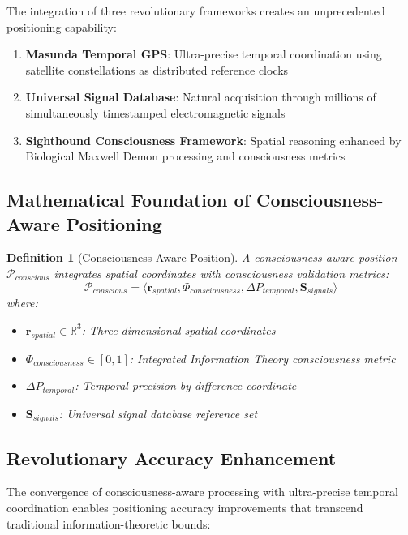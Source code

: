 \documentclass[12pt,a4paper]{article}
\newtheorem{definition}[theorem]{Definition}
\newcommand{\R}{\mathbb{R}}
\begin{document}
The integration of three revolutionary frameworks creates an unprecedented positioning capability:

\begin{enumerate}
\item \textbf{Masunda Temporal GPS}: Ultra-precise temporal coordination using satellite constellations as distributed reference clocks
\item \textbf{Universal Signal Database}: Natural acquisition through millions of simultaneously timestamped electromagnetic signals
\item \textbf{Sighthound Consciousness Framework}: Spatial reasoning enhanced by Biological Maxwell Demon processing and consciousness metrics
\end{enumerate}

\subsection{Mathematical Foundation of Consciousness-Aware Positioning}

\begin{definition}[Consciousness-Aware Position]
A consciousness-aware position $\mathcal{P}_{conscious}$ integrates spatial coordinates with consciousness validation metrics:
\begin{equation}
\mathcal{P}_{conscious} = \langle \mathbf{r}_{spatial}, \Phi_{consciousness}, \Delta P_{temporal}, \mathbf{S}_{signals} \rangle
\end{equation}
where:
\begin{itemize}
\item $\mathbf{r}_{spatial} \in \R^3$: Three-dimensional spatial coordinates
\item $\Phi_{consciousness} \in [0,1]$: Integrated Information Theory consciousness metric
\item $\Delta P_{temporal}$: Temporal precision-by-difference coordinate
\item $\mathbf{S}_{signals}$: Universal signal database reference set
\end{itemize}
\end{definition}

\subsection{Revolutionary Accuracy Enhancement}

The convergence of consciousness-aware processing with ultra-precise temporal coordination enables positioning accuracy improvements that transcend traditional information-theoretic bounds:
\end{document}
